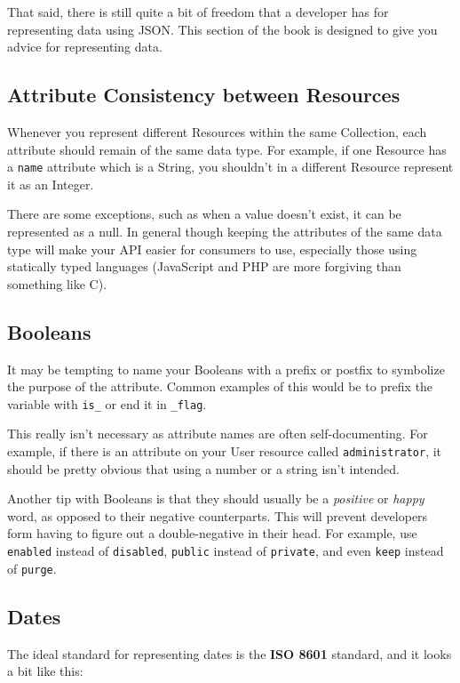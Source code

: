 \documentclass{book}
\begin{document}
That said, there is still quite a bit of freedom that a developer has for representing data using JSON. This section of the book is designed to give you advice for representing data.

\subsection{Attribute Consistency between Resources}

Whenever you represent different Resources within the same Collection, each attribute should remain of the same data type. For example, if one Resource has a \texttt{name} attribute which is a String, you shouldn't in a different Resource represent it as an Integer.

There are some exceptions, such as when a value doesn't exist, it can be represented as a null. In general though keeping the attributes of the same data type will make your API easier for consumers to use, especially those using statically typed languages (JavaScript and PHP are more forgiving than something like C).

\subsection{Booleans}

It may be tempting to name your Booleans with a prefix or postfix to symbolize the purpose of the attribute. Common examples of this would be to prefix the variable with \texttt{is\_} or end it in \texttt{\_flag}.

This really isn't necessary as attribute names are often self-documenting. For example, if there is an attribute on your User resource called \texttt{administrator}, it should be pretty obvious that using a number or a string isn't intended.

Another tip with Booleans is that they should usually be a \emph{positive} or \emph{happy} word, as opposed to their negative counterparts. This will prevent developers form having to figure out a double-negative in their head. For example, use \texttt{enabled} instead of \texttt{disabled}, \texttt{public} instead of \texttt{private}, and even \texttt{keep} instead of \texttt{purge}.

\subsection{Dates}

The ideal standard for representing dates is the \textbf{ISO 8601} standard, and it looks a bit like this:
\end{document}
